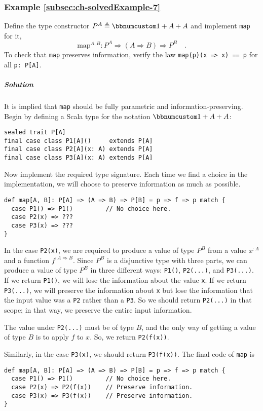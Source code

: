 \subsubsection{Example \label{subsec:ch-solvedExample-7}\ref{subsec:ch-solvedExample-7}}

Define the type constructor $P^{A}\triangleq\bbnum 1+A+A$ and implement
\lstinline!map! for it,
\[
\text{map}^{A,B}:P^{A}\Rightarrow(A\Rightarrow B)\Rightarrow P^{B}\quad.
\]
To check that \lstinline!map! preserves information, verify the law
\lstinline!map(p)(x => x) == p! for all \lstinline!p: P[A]!.

\subparagraph{Solution}

It is implied that \lstinline!map! should be fully parametric and
information-preserving. Begin by defining a Scala type for the notation
$\bbnum 1+A+A$:
\begin{lstlisting}
sealed trait P[A]
final case class P1[A]()     extends P[A]
final case class P2[A](x: A) extends P[A]
final case class P3[A](x: A) extends P[A]
\end{lstlisting}
Now implement the required type signature. Each time we find a choice
in the implementation, we will choose to preserve information as much
as possible.
\begin{lstlisting}
def map[A, B]: P[A] => (A => B) => P[B] = p => f => p match {
  case P1() => P1()         // No choice here.
  case P2(x) => ???
  case P3(x) => ???
}
\end{lstlisting}
In the case \lstinline!P2(x)!, we are required to produce a value
of type $P^{B}$ from a value $x^{:A}$ and a function $f^{:A\Rightarrow B}$.
Since $P^{B}$ is a disjunctive type with three parts, we can produce
a value of type $P^{B}$ in three different ways: \lstinline!P1()!,
\lstinline!P2(...)!, and \lstinline!P3(...)!. If we return \lstinline!P1()!,
we will lose the information about the value \lstinline!x!. If we
return \lstinline!P3(...)!, we will preserve the information about
\lstinline!x! but lose the information that
the input value was a \lstinline!P2! rather than a \lstinline!P3!.
So we should return \lstinline!P2(...)! in that scope; in that way,
we preserve the entire input information. 

The value under \lstinline!P2(...)! must be of type $B$, and the
only way of getting a value of type $B$ is to apply $f$ to $x$.
So, we return \lstinline!P2(f(x))!.

Similarly, in the case \lstinline!P3(x)!, we should return \lstinline!P3(f(x))!.
The final code of \lstinline!map! is
\begin{lstlisting}
def map[A, B]: P[A] => (A => B) => P[B] = p => f => p match {
  case P1() => P1()         // No choice here.
  case P2(x) => P2(f(x))    // Preserve information.
  case P3(x) => P3(f(x))    // Preserve information.
}
\end{lstlisting}


